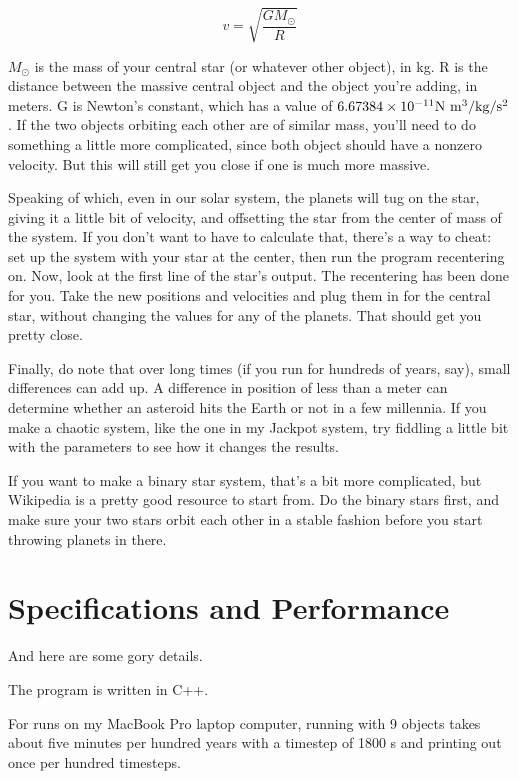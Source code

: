 \documentclass{article}
\begin{document}
\begin{equation}
	v = \sqrt{\frac{G M_\odot}{R}}
\end{equation}

$M_\odot$ is the mass of your central star (or whatever other object), in kg.  R is the distance between the massive central object and the object you're adding, in meters.  G is Newton's constant, which has a value of $6.67384\times10^{-11} \rm{N~m^3/kg/s^2}$.  If the two objects orbiting each other are of similar mass, you'll need to do something a little more complicated, since both object should have a nonzero velocity.  But this will still get you close if one is much more massive.

Speaking of which, even in our solar system, the planets will tug on the star, giving it a little bit of velocity, and offsetting the star from the center of mass of the system.  If you don't want to have to calculate that, there's a way to cheat: set up the system with your star at the center, then run the program recentering on.  Now, look at the first line of the star's output.  The recentering has been done for you.  Take the new positions and velocities and plug them in for the central star, without changing the values for any of the planets.  That should get you pretty close.

Finally, do note that over long times (if you run for hundreds of years, say), small differences can add up.  A difference in position of less than a meter can determine whether an asteroid hits the Earth or not in a few millennia.  If you make a chaotic system, like the one in my Jackpot system, try fiddling a little bit with the parameters to see how it changes the results.

If you want to make a binary star system, that's a bit more complicated, but Wikipedia is a pretty good resource to start from.  Do the binary stars first, and make sure your two stars orbit each other in a stable fashion before you start throwing planets in there.

\section{Specifications and Performance}\label{sec:details}

And here are some gory details.

The program is written in C++.

For runs on my MacBook Pro laptop computer, running with 9 objects takes about five minutes per hundred years with a timestep of 1800 s and printing out once per hundred timesteps.
\end{document}
